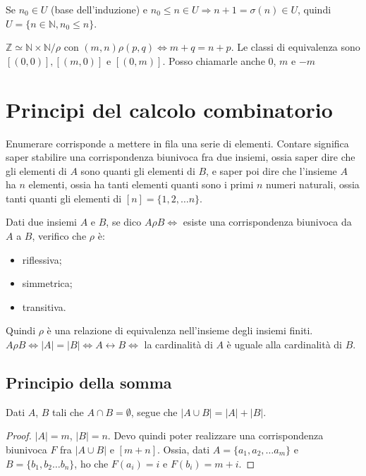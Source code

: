 Se $n_0 \in U$ (base dell'induzione) e $n_0 \le n \in U \Rightarrow n+1 = \sigma(n) \in U$, quindi $U = \{ n \in \mathbb{N}, n_0  \le n\}$.

$\mathbb{Z} \simeq \mathbb{N} \times \mathbb{N} / \rho$ con $(m, n) \rho (p, q) \Leftrightarrow m + q = n + p$. Le classi di equivalenza sono $[(0,0)], [(m,0)]$ e $[(0,m)]$. Posso chiamarle anche 0, $m$ e $-m$

\section{Principi del calcolo combinatorio}

Enumerare corrisponde a mettere in fila una serie di elementi. Contare significa saper stabilire una corrispondenza biunivoca fra due insiemi, ossia saper dire che gli elementi di $A$ sono quanti gli elementi di $B$, e saper poi dire che l'insieme $A$ ha $n$ elementi, ossia ha tanti elementi quanti sono i primi $n$ numeri naturali, ossia tanti quanti gli elementi di $[n] = \{1, 2, \dots n \}$.

Dati due insiemi $A$ e $B$, se dico $A \rho B \Leftrightarrow $ esiste una corrispondenza biunivoca da $A$ a $B$, verifico che $\rho$ \`e:
\begin{itemize}
   \item riflessiva;
   \item simmetrica;
   \item transitiva.
 \end{itemize} 
 Quindi $\rho$ \`e una relazione di equivalenza nell'insieme degli insiemi finiti. $A \rho B \Leftrightarrow |A| = |B| \Leftrightarrow A \leftrightarrow B \Leftrightarrow$ la cardinalit\`a di $A$ \`e uguale alla cardinalit\`a di $B$.

\subsection{Principio della somma}

\begin{prop}
 Dati $A$, $B$ tali che $A \cap B = \emptyset$, segue che $|A \cup B| = |A| + |B|$.
\end{prop}
\begin{proof}
$|A| = m$, $|B| = n$. Devo quindi poter realizzare una corrispondenza biunivoca $F$ fra $|A \cup B|$ e $[m + n]$. Ossia, dati $A = \{ a_1, a_2, \dots a_m\}$ e $B = \{ b_1, b_2 \dots b_n\}$, ho che $F(a_i) = i$ e $F(b_i) = m + i$.
\end{proof}

